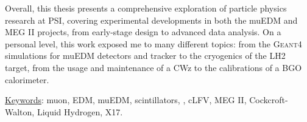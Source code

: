 \noindent
Overall, this thesis presents a comprehensive exploration of particle physics research at PSI, covering experimental developments in both the muEDM and MEG II projects, from early-stage design to advanced data analysis.
On a personal level, this work exposed me to many different topics: from the \textsc{Geant4} simulations for muEDM detectors and tracker to the cryogenics of the LH2 target, from the usage and maintenance of a CWz to the calibrations of a BGO calorimeter.

\vfill
\begin{center}
\begin{minipage}{0.6\textwidth}
\underline{Keywords}: muon, EDM, muEDM, scintillators, \gf, cLFV, MEG II, Cockcroft-Walton, Liquid Hydrogen, X17.
\end{minipage}
\end{center}

\thispagestyle{empty}
\mbox{}